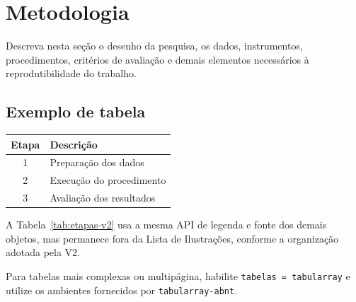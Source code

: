 \section{Metodologia}\label{sec:metodologia}

Descreva nesta seção o desenho da pesquisa, os dados, instrumentos, procedimentos, critérios de avaliação e demais elementos necessários à reprodutibilidade do trabalho.

\subsection{Exemplo de tabela}

\label{tab:etapas-v2}
\begin{ufcobjeto}[here]
  \centering
  \begin{tabular}{cl}
    \hline
    Etapa & Descrição \\
    \hline
    1 & Preparação dos dados \\
    2 & Execução do procedimento \\
    3 & Avaliação dos resultados \\
    \hline
  \end{tabular}
\end{ufcobjeto}

A Tabela~\ref{tab:etapas-v2} usa a mesma API de legenda e fonte dos demais objetos, mas permanece fora da Lista de Ilustrações, conforme a organização adotada pela V2.

Para tabelas mais complexas ou multipágina, habilite \texttt{tabelas = tabularray} e utilize os ambientes fornecidos por \texttt{tabularray-abnt}.
